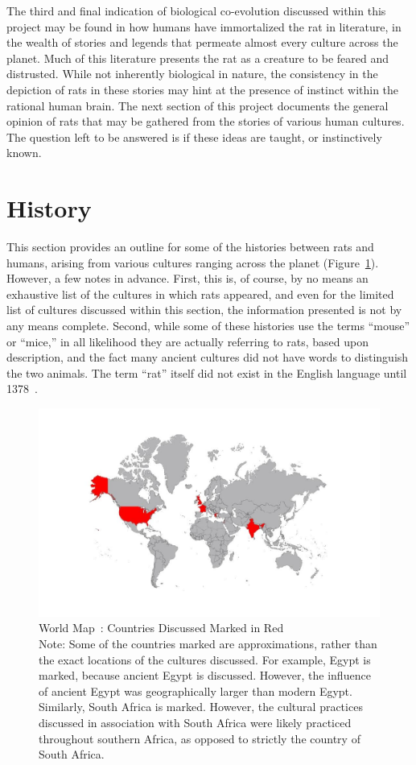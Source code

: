 \documentclass[12pt]{article}
\begin{document}
The third and final indication of biological co-evolution discussed within this project may be found in how humans have immortalized the rat in literature, in the wealth of stories and legends that permeate almost every culture across the planet. Much of this literature presents the rat as a creature to be feared and distrusted. While not inherently biological in nature, the consistency in the depiction of rats in these stories may hint at the presence of instinct within the rational human brain. The next section of this project documents the general opinion of rats that may be gathered from the stories of various human cultures. The question left to be answered is if these ideas are taught, or instinctively known.

\section{History} \label{History}

This section provides an outline for some of the histories between rats and humans, arising from various cultures ranging across the planet (Figure~\ref{WorldMapFigure}). However, a few notes in advance. First, this is, of course, by no means an exhaustive list of the cultures in which rats appeared, and even for the limited list of cultures discussed within this section, the information presented is not by any means complete. Second, while some of these histories use the terms ``mouse'' or ``mice,'' in all likelihood they are actually referring to rats, based upon description, and the fact many ancient cultures did not have words to distinguish the two animals. The term ``rat'' itself did not exist in the English language until 1378~\cite{ONeill}.
\begin{figure}
\centering
\includegraphics[width=6in,trim={0 .4in 0 .4in},clip]{WorldMap}
\caption{World Map~\cite{VisitedCountries2014}: Countries Discussed Marked in Red\\
Note: Some of the countries marked are approximations, rather than the exact locations of the cultures discussed. For example, Egypt is marked, because ancient Egypt is discussed. However, the influence of ancient Egypt was geographically larger than modern Egypt. Similarly, South Africa is marked. However, the cultural practices discussed in association with South Africa were likely practiced throughout southern Africa, as opposed to strictly the country of South Africa.}
\label{WorldMapFigure}
\end{figure}
\end{document}
